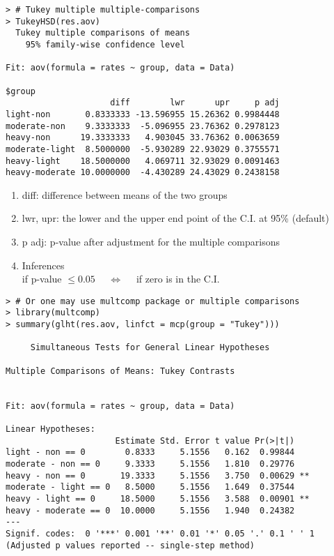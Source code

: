 \begin{frame}[fragile]
\begin{lstlisting}
> # Tukey multiple multiple-comparisons
> TukeyHSD(res.aov)
  Tukey multiple comparisons of means
    95% family-wise confidence level

Fit: aov(formula = rates ~ group, data = Data)

$group
                     diff        lwr      upr     p adj
light-non       0.8333333 -13.596955 15.26362 0.9984448
moderate-non    9.3333333  -5.096955 23.76362 0.2978123
heavy-non      19.3333333   4.903045 33.76362 0.0063659
moderate-light  8.5000000  -5.930289 22.93029 0.3755571
heavy-light    18.5000000   4.069711 32.93029 0.0091463
heavy-moderate 10.0000000  -4.430289 24.43029 0.2438158
\end{lstlisting}
\vfill
\begin{enumerate}
	\item diff: difference between means of the two groups
	\item lwr, upr: the lower and the upper end point of the C.I. at 95\% (default)
	\item p adj: p-value after adjustment for the multiple comparisons
		\vspace{1em}
	\item[]
		\begin{center}
			Inferences \\
		if p-value $\le 0.05$  $\quad\Longleftrightarrow\quad$ if zero is in the C.I.
		\end{center}
\end{enumerate}
\end{frame}
\begin{frame}[fragile]
\begin{lstlisting}
> # Or one may use multcomp package or multiple comparisons
> library(multcomp)
> summary(glht(res.aov, linfct = mcp(group = "Tukey")))

	 Simultaneous Tests for General Linear Hypotheses

Multiple Comparisons of Means: Tukey Contrasts


Fit: aov(formula = rates ~ group, data = Data)

Linear Hypotheses:
                      Estimate Std. Error t value Pr(>|t|)
light - non == 0        0.8333     5.1556   0.162  0.99844
moderate - non == 0     9.3333     5.1556   1.810  0.29776
heavy - non == 0       19.3333     5.1556   3.750  0.00629 **
moderate - light == 0   8.5000     5.1556   1.649  0.37544
heavy - light == 0     18.5000     5.1556   3.588  0.00901 **
heavy - moderate == 0  10.0000     5.1556   1.940  0.24382
---
Signif. codes:  0 '***' 0.001 '**' 0.01 '*' 0.05 '.' 0.1 ' ' 1
(Adjusted p values reported -- single-step method)
\end{lstlisting}
\end{frame}
